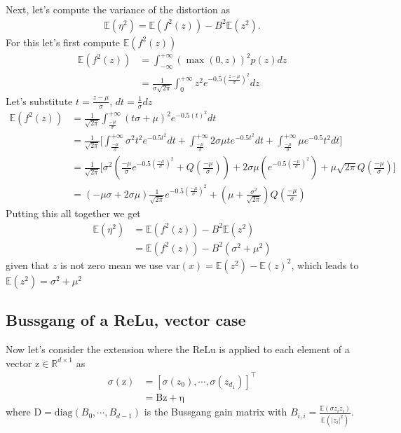 \documentclass[12pt]{article}
\newcommand{\vect}[1]{\boldsymbol{\mathrm{#1}}}
\newcommand{\mat}[1]{\boldsymbol{\mathrm{#1}}}
\newcommand{\diag}{\text{diag}}
\newcommand{\expt}[1]{\mathbb{E}\left(#1\right)}
\theoremstyle{remark}
\begin{document}
Next, let's compute the variance of the distortion as
\begin{align}
	\expt{\eta^2} = \expt{f^2(z)} - B^2\expt{z^2}.
\end{align}
For this let's first compute $\expt{f^2(z)}$
\begin{align}
	\expt{f^2(z)} &= \int_{-\infty}^{+\infty} \left(\max(0, z)\right)^2 p(z) dz\\
	&= \frac{1}{\sigma \sqrt{2\pi}} \int_{0}^{+\infty} z^2 e^{-0.5 (\frac{z-\mu}{\sigma})^2}dz
\end{align}
Let's substitute $t = \frac{z-\mu}{\sigma}$, $dt = \frac{1}{\sigma}dz$ 
\begin{align}
	\expt{f^2(z)} &= \frac{1}{\sqrt{2\pi}} \int_{\frac{-\mu}{\sigma}}^{+\infty} (t\sigma + \mu)^2 e^{-0.5 (t)^2}dt\\
	&= \frac{1}{\sqrt{2\pi}}\Bigg[\int_{\frac{-\mu}{\sigma}}^{+\infty} \sigma^2 t^2 e^{-0.5t^2} dt + \int_{\frac{-\mu}{\sigma}}^{+\infty} 2\sigma\mu t e^{-0.5t^2}dt + \int_{\frac{-\mu}{\sigma}}^{+\infty} \mu e^{-0.5}t^2dt\Bigg]\\
	&=  \frac{1}{\sqrt{2\pi}}\Bigg[\sigma^2 \left(\frac{-\mu}{\sigma} e^{-0.5(\frac{-\mu}{\sigma})^2} + Q(\frac{-\mu}{\sigma})\right) + 2 \sigma \mu \left(e^{-0.5 (\frac{-\mu}{\sigma})^2}\right) + \mu \sqrt{2\pi} Q\left(\frac{-\mu}{\sigma}\right)\Bigg]\\
	&= \left(-\mu \sigma + 2\sigma\mu\right) \frac{1}{\sqrt{2\pi}}e^{-0.5(\frac{-\mu}{\sigma})^2} + \left(\mu + \frac{\sigma^2}{\sqrt{2\pi}}\right) Q\left(\frac{-\mu}{\sigma}\right)
\end{align}
Putting this all together we get 
\begin{align}
	\expt{\eta^2} &= \expt{f^2(z)} - B^2\expt{z^2}\\
	&= \expt{f^2(z)} - B^2 (\sigma^2 + \mu^2)
\end{align}
given that $z$ is not zero mean we use $\mathrm{var}(x) = \expt{z^2} - \expt{z}^2$, which leads to $\expt{z^2} = \sigma^2 + \mu^2 $

\subsection{Bussgang of a ReLu, vector case}
Now let's consider the extension where the ReLu is applied to each element of a vector $\vect{z}\in\mathbb{R}^{d\times1}$ as
\begin{align}
	\sigma(\vect{z}) &= \left[\sigma(z_0), \cdots, \sigma(z_{d_1})\right]^{\intercal}\\
	&= \mat{B} \vect{z} + \vect{\eta}
\end{align}
where $\mat{D} = \diag(B_0, \cdots, B_{d-1})$ is the Bussgang gain matrix with $B_{i,i} = \frac{\expt{\sigma{z_i}z_i}}{\expt{|z_i|^2}}$.
\end{document}
